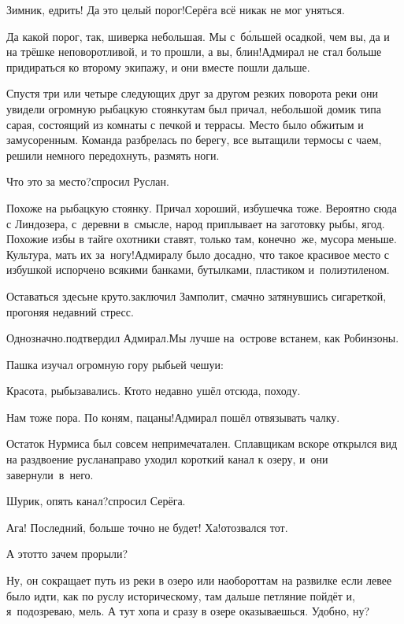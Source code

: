 \diagdash Зимник, едрить! Да это целый порог!\mdash Серёга всё никак не мог уняться.

\diagdash Да какой порог, так, шиверка небольшая. Мы с~б\'{о}льшей осадкой, чем вы, да и на трёшке неповоротливой, и то прошли, а вы, блин!\mdash Адмирал не стал больше придираться ко второму экипажу, и они вместе пошли дальше. 

Спустя три или четыре следующих друг за другом резких поворота реки они увидели огромную рыбацкую стоянку\mdash там был причал, небольшой домик типа сарая, состоящий из комнаты с печкой и террасы. Место было обжитым и замусоренным. Команда разбрелась по берегу, все вытащили термосы с чаем, решили немного передохнуть, размять ноги.

\diagdash Что это за место?\mdash спросил Руслан.

\diagdash Похоже на рыбацкую стоянку. Причал хороший, избушечка тоже. Вероятно сюда с Линдозера, с~деревни в~смысле, народ приплывает на заготовку рыбы, ягод. Похожие избы в тайге охотники ставят, только там, конечно~же, мусора меньше. Культура, мать их за~ногу!\mdash Адмиралу было досадно, что такое красивое место с избушкой испорчено всякими банками, бутылками, пластиком и~полиэтиленом.

\diagdash Оставаться здесь\mdash не круто.\mdash заключил Замполит, смачно затянувшись сигареткой, прогоняя недавний стресс.

\diagdash Однозначно.\mdash подтвердил Адмирал.\mdash Мы лучше на~острове встанем, как Робинзоны.

Пашка изучал огромную гору рыбьей чешуи:

\diagdash Красота, рыбы\mdash завались. Кто\sdash то недавно ушёл отсюда, походу.

\diagdash Нам тоже пора. По коням, пацаны!\mdash Адмирал пошёл отвязывать чалку.

Остаток Нурмиса был совсем непримечатален. Сплавщикам вскоре открылся вид на раздвоение русла\mdash направо уходил короткий канал к озеру, и~они завернули~в~него.

\diagdash Шурик, опять канал?\mdash спросил Серёга.

\diagdash Ага! Последний, больше точно не будет! Ха!\mdash отозвался тот.

\diagdash А этот\sdash то зачем прорыли? 

\diagdash Ну, он сокращает путь из реки в озеро или наоборот\mdash там на развилке если левее было идти, как по руслу историческому, там дальше петляние пойдёт и, я~подозреваю, мель. А тут хопа и сразу в озере оказываешься. Удобно, ну?


